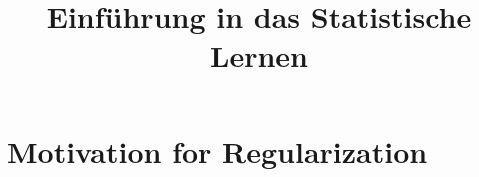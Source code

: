 



\newcommand{\titlefigure}{figure_man/biasvariance_scheme.png}
\newcommand{\learninggoals}{
  \item Understand why overfitting happens
  \item Know how overfitting can be avoided
  \item Know regularized empirical risk minimization
}

\title{Einführung in das Statistische Lernen}
\date{}




\section{Motivation for Regularization}


